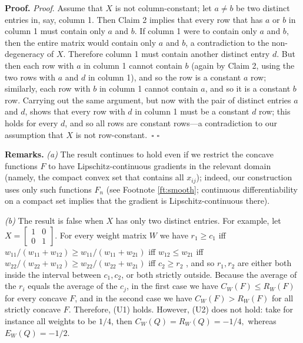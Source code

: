 \documentclass[12pt,a4paper,notitlepage]{article}
\newenvironment{proof}[1][Proof]{\noindent\textbf{#1.} }{\hfill $\square$}
\begin{document}
\begin{proof}
\emph{Proof}. Assume that $X$ is not column-constant; let $a\neq b$ be two
distinct entries in, say, column 1. Then Claim 2 implies that every row that
has $a$ or $b$ in column 1 must contain only $a$ and $b$. If column 1 were
to contain only $a$ and $b$, then the entire matrix would contain only $a$
and $b$, a contradiction to the non-degeneracy of $X$. Therefore column 1
must contain another distinct entry $d$. But then each row with $a$ in
column 1 cannot contain $b$ (again by Claim 2, using the two rows with $a$
and $d$ in column 1), and so the row is a constant $a$ row; similarly, each
row with $b$ in column 1 cannot contain $a$, and so it is a constant $b$
row. Carrying out the same argument, but now with the pair of distinct
entries $a$ and $d$, shows that every row with $d$ in column 1 must be a
constant $d$ row; this holds for every $d$, and so all rows are constant
rows---a contradiction to our assumption that $X$ is not row-constant.~$%
\square $
\end{proof}

\bigskip

\noindent \textbf{Remarks. }\emph{(a) }The result continues to hold even if
we restrict the concave functions $F$ to have Lipschitz-continuous gradients
in the relevant domain (namely, the compact convex set that contains all $%
x_{ij}$); indeed, our construction uses only such functions $F_{n}$ (see
Footnote \ref{ft:smooth}; continuous differentiability on a compact set
implies that the gradient is Lipschitz-continuous there).

\emph{(b)} The result is false when $X$ has only two distinct entries. For
example, let $X=\left[ 
\begin{array}{cc}
1 & 0 \\ 
0 & 1%
\end{array}%
\right] $. For every weight matrix $W$ we have $r_{1}\geq c_{1}$ iff $%
w_{11}/(w_{11}+w_{12})\geq w_{11}/(w_{11}+w_{21})$ iff $w_{12}\leq w_{21}$
iff $w_{22}/(w_{22}+w_{12})\geq w_{22}/(w_{22}+w_{21})$ iff $c_{2}\geq r_{2}$%
, and so $r_{1},r_{2}$ are either both inside the interval between $%
c_{1},c_{2}$, or both strictly outside. Because the average of the $r_{i}$
equals the average of the $c_{j}$, in the first case we have $C_{W}(F)\leq
R_{W}(F)$ for every concave $F$, and in the second case we have $%
C_{W}(F)>R_{W}(F)$ for all strictly concave $F.$ Therefore, (U1) holds.
However, (U2) does not hold: take for instance all weights to be $1/4$, then 
$C_{W}(Q)=R_{W}(Q)=-1/4,$ whereas $E_{W}(Q)=-1/2$.
\end{document}
